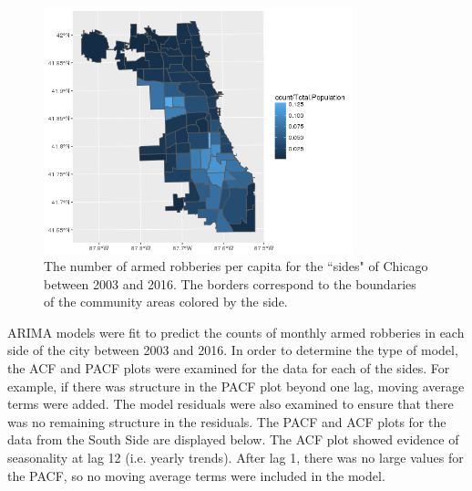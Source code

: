 \documentclass{article} %
\begin{document}
\begin{figure}[h]
\begin{center}

\includegraphics[width=0.8\textwidth,keepaspectratio]{Plots/counts_by_pop.png}
\caption{The number of armed robberies per capita for the ``sides" of Chicago between 2003 and 2016.  The borders correspond to  the boundaries of the community areas colored by the side.}
\label{counts}
\end{center}
\end{figure}

\noindent ARIMA models were fit to predict the counts of monthly armed robberies in each side of the city between 2003 and 2016. In order to determine the type of model, the ACF and PACF plots were examined for the data for each of the sides. For example, if there was structure in the PACF plot beyond one lag, moving average terms were added. The model residuals were also examined to ensure that there was no remaining structure in the residuals. The PACF and ACF plots for the data from the South Side are displayed below. The ACF plot showed evidence of seasonality at lag 12 (i.e. yearly trends). After lag 1, there was no large values for the PACF, so no moving average terms were included in the model. \newline
\end{document}
